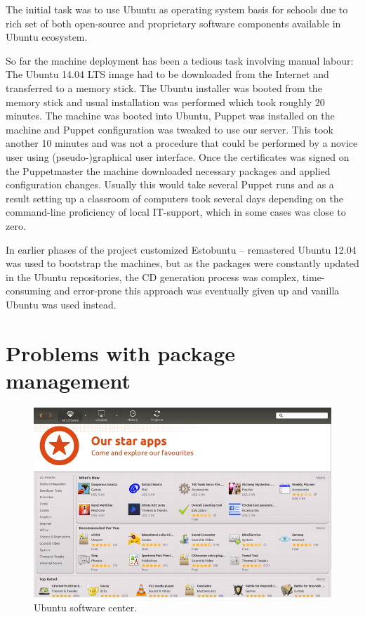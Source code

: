 \documentclass[a4paper,11pt]{kth-mag}
\begin{document}
The initial task was to use Ubuntu as operating system basis
for schools due to rich set of both open-source and
proprietary software components available in Ubuntu ecosystem.

So far the machine deployment has been a tedious task involving
manual labour:
The Ubuntu 14.04 LTS image had to be downloaded from the Internet
and transferred to a memory stick.
The Ubuntu installer was booted from the memory stick
and usual installation was performed which took roughly 20 minutes.
The machine was booted into Ubuntu,
Puppet was installed on the machine and Puppet configuration
was tweaked to use our server.
This took another 10 minutes and was not a procedure that could
be performed by a novice user using (pseudo-)graphical user interface.
Once the certificates was signed on the Puppetmaster the
machine downloaded necessary packages and applied configuration
changes.
Usually this would take several Puppet runs and as a result
setting up a classroom of computers took several days
depending on the command-line proficiency of local
IT-support, which in some cases was close to zero.

In earlier phases of the project
customized Estobuntu \cite{estobuntu} -- remastered \cite{livecd-customization} Ubuntu 12.04 
was used to bootstrap the machines, but as the
packages were constantly updated in the Ubuntu repositories,
the CD generation process was complex, time-consuming and
error-prone this approach was eventually given up
and vanilla \cite{vanilla} Ubuntu was used instead.

\section{Problems with package management}

\begin{figure}[tbhp]
  \centering
  \includegraphics[width=\textwidth]{images/ubuntu-software-center.png}
  \caption{Ubuntu software center.}
  \label{fig:ubuntu-software-center}
\end{figure}
\end{document}

